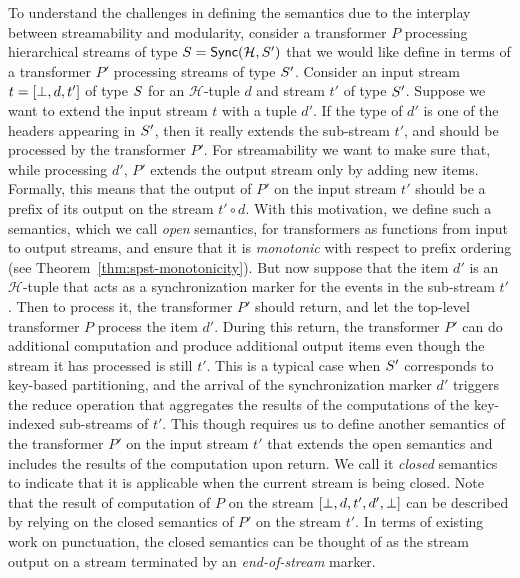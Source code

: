
To understand  the challenges in defining the semantics due to the interplay between streamability and modularity, consider a transformer $P$ processing
hierarchical streams of type  $\ss=\hier{\mathcal{H}}{\ss'}$ that we would like
define in terms of a transformer $P'$ processing streams of type $\ss'$.
Consider an input stream $t=[\spsemp, d, t']$ of type $\ss$ for an $\mathcal{H}$-tuple $d$ and
stream $t'$ of type $\ss'$. Suppose we want to extend the input stream $t$ with
a tuple $d'$. If the type of $d'$ is one of the headers appearing in $\ss'$, then
it really extends the sub-stream $t'$, and should be processed by the transformer $P'$.
For streamability we want to make sure that, while processing $d'$, $P'$ extends the output stream only
by adding new items. Formally, this means that the output of $P'$ on the input
stream $t'$ should be a prefix of its output on the stream $t'\circ d$.
With this motivation, we define such a semantics, which we call {\em open} semantics,
for transformers as functions from input to output streams, and ensure that it is {\em monotonic}
 with respect to prefix ordering
(see Theorem~\ref{thm:spst-monotonicity}).
But now suppose that the item $d'$ is an ${\mathcal H}$-tuple
that acts as a synchronization marker for the events in the sub-stream $t'$.
Then to process it, the transformer $P'$ should return, and let the top-level
transformer $P$ process the item $d'$.
During this return, the transformer $P'$ can do additional computation and produce
additional output items even though the stream it has processed is still $t'$.
This is a typical case when $\ss'$ corresponds to key-based partitioning,
and the arrival of the synchronization marker $d'$ triggers the reduce operation
that aggregates the results of the computations of the key-indexed sub-streams of $t'$.
This though requires us to define another semantics of the transformer $P'$ on
the input stream $t'$ that extends the open semantics and includes the results
of the computation upon return. We call it {\em closed} semantics to indicate
that it is applicable when the current stream  is being closed.
Note that the result of computation of $P$ on the stream $[\spsemp, d,t',d', \spsemp]$ can be
described by relying on the closed semantics of $P'$ on the stream $t'$.
In terms of existing work on punctuation,
the closed semantics can be thought of as the stream output on
a stream terminated by an \emph{end-of-stream} marker.

